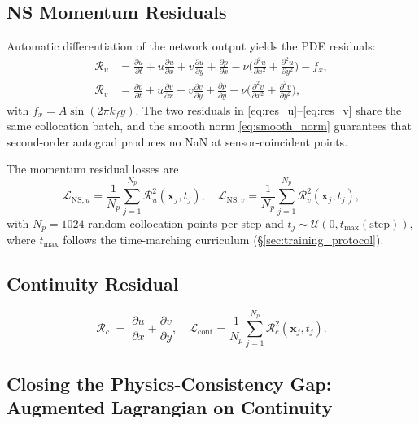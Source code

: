 \subsection{NS Momentum Residuals}

Automatic differentiation of the network output yields the PDE residuals:
\begin{align}
    \label{eq:res_u}
    \mathcal{R}_u &= \frac{\partial u}{\partial t} + u\frac{\partial u}{\partial x} + v\frac{\partial u}{\partial y} + \frac{\partial p}{\partial x} - \nu\Big(\frac{\partial^2 u}{\partial x^2}+\frac{\partial^2 u}{\partial y^2}\Big) - f_x,\\
    \label{eq:res_v}
    \mathcal{R}_v &= \frac{\partial v}{\partial t} + u\frac{\partial v}{\partial x} + v\frac{\partial v}{\partial y} + \frac{\partial p}{\partial y} - \nu\Big(\frac{\partial^2 v}{\partial x^2}+\frac{\partial^2 v}{\partial y^2}\Big),
\end{align}
with $f_x = A\sin(2\pi k_f y)$. The two residuals in \eqref{eq:res_u}--\eqref{eq:res_v} share the same collocation batch, and the smooth norm \eqref{eq:smooth_norm} guarantees that second-order autograd produces no NaN at sensor-coincident points.

The momentum residual losses are
\begin{equation*}
    \mathcal{L}_{\text{NS},u} = \frac{1}{N_p}\sum_{j=1}^{N_p}\mathcal{R}_u^2(\mathbf{x}_j, t_j),\quad
    \mathcal{L}_{\text{NS},v} = \frac{1}{N_p}\sum_{j=1}^{N_p}\mathcal{R}_v^2(\mathbf{x}_j, t_j),
\end{equation*}
with $N_p = 1024$ random collocation points per step and $t_j \sim \mathcal{U}(0, t_{\max}(\text{step}))$, where $t_{\max}$ follows the time-marching curriculum (\S\ref{sec:training_protocol}).

\subsection{Continuity Residual}
\label{subsec:continuity}

\begin{equation}
    \label{eq:cont_res}
    \mathcal{R}_c \;=\; \frac{\partial u}{\partial x} + \frac{\partial v}{\partial y},\quad \mathcal{L}_{\text{cont}} = \frac{1}{N_p}\sum_{j=1}^{N_p}\mathcal{R}_c^2(\mathbf{x}_j,t_j).
\end{equation}

\subsection{Closing the Physics-Consistency Gap: Augmented Lagrangian on Continuity}
\label{subsec:al_cont}

